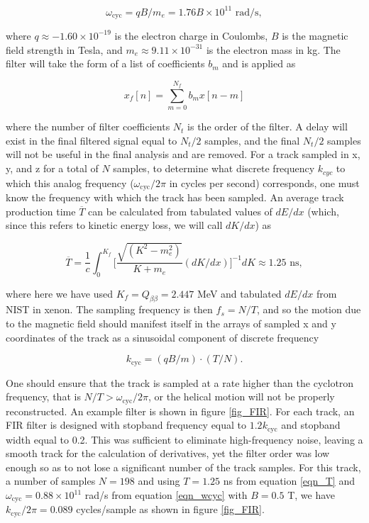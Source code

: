 \documentclass{JINST}
\begin{document}
\begin{equation}\label{eqn_wcyc}
\omega_{\mathrm{cyc}} = qB/m_{e} = 1.76B \times 10^{11} \,\, \mathrm{rad/s},
\end{equation}

\noindent where $q \approx -1.60 \times 10^{-19}$ is the electron charge in Coulombs, $B$ is the magnetic field
strength in Tesla, and $m_{e} \approx 9.11 \times 10^{-31}$ is the electron mass in kg.  The filter will take the form of a 
list of coefficients $b_{m}$ and is applied as
  
\begin{equation}
  x_{f}[n] = \sum_{m=0}^{N_f} b_{m}x[n-m]
\end{equation}
  
\noindent where the number of filter coefficients $N_{t}$ is the order of the filter.  A delay will exist in the
final filtered signal equal to $N_{t}/2$ samples, and the final $N_{t}/2$ samples will not be useful in the final analysis
and are removed.
For a track sampled in x, y, and z for a total of $N$ samples, to determine what discrete frequency $k_{cyc}$ to which
this analog frequency ($\omega_{\mathrm{cyc}}/2\pi$ in cycles per second) corresponds, one must know the frequency 
with which the track has been sampled.  An average track production time $\overline{T}$ can be calculated from 
tabulated values of $dE/dx$ (which, since this refers to kinetic energy loss, we will call $dK/dx$) as

\begin{equation}\label{eqn_T}
\overline{T} = \frac{1}{c}\int_{0}^{K_{f}} \biggl[\frac{\sqrt{(K^2-m_e^2)}}{K+m_e}(dK/dx)\biggr]^{-1} dK \approx 1.25 \,\, \mathrm{ns},
\end{equation}

\noindent where here we have used $K_{f} = Q_{\beta\beta} = 2.447$ MeV and tabulated 
$dE/dx$ from NIST \cite{NIST_mac} in xenon.  The sampling frequency is then $f_{s} = N/T$, and so the motion
due to the magnetic field should manifest itself in the arrays of sampled x and y coordinates
of the track as a sinusoidal component of discrete frequency 

\begin{equation}\label{eqn_kcyc}
k_{\mathrm{cyc}} = (qB/m)\cdot(T/N).
\end{equation}

One should ensure that the track is sampled at a rate higher than the cyclotron
frequency, that is $N/T > \omega_{\mathrm{cyc}}/2\pi$, or the helical motion will not be properly
reconstructed.  An example filter is shown in figure \ref{fig_FIR}.  For each track, an FIR filter is designed with 
stopband frequency equal to $1.2k_{\mathrm{cyc}}$ and stopband width equal to 0.2.  This was sufficient to 
eliminate high-frequency noise, leaving a smooth track for the calculation of derivatives, yet the filter order was
low enough so as to not lose a significant number of the track samples.  For this track, a number of samples 
$N = 198$ and using $T = 1.25$ ns from equation \ref{eqn_T} and $\omega_{\mathrm{cyc}} = 0.88 \times 
10^{11}$ rad/s from equation \ref{eqn_wcyc} with $B = 0.5$ T, we have $k_{\mathrm{cyc}}/2\pi = 0.089$ cycles/sample as shown in figure \ref{fig_FIR}.
\end{document}

